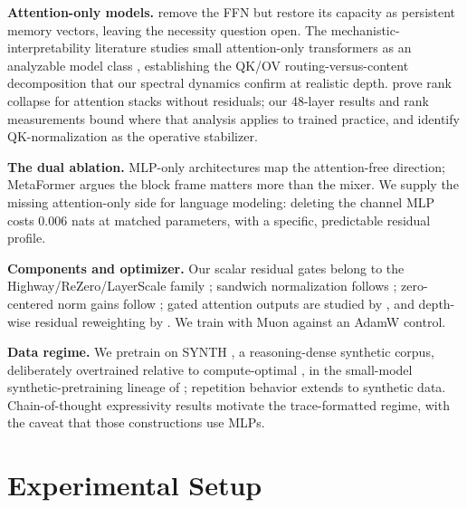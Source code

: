 \documentclass[letterpaper]{article} %
\begin{document}
\textbf{Attention-only models.} \citet{sukhbaatar2019augmenting} remove
the FFN but restore its capacity as persistent memory vectors, leaving the
necessity question open. The mechanistic-interpretability literature
studies small attention-only transformers as an analyzable model class
\citep{elhage2021mathematical,olsson2022context}, establishing the QK/OV
routing-versus-content decomposition that our spectral dynamics confirm at
realistic depth. \citet{dong2021attention} prove rank collapse for
attention stacks without residuals; our 48-layer results and rank
measurements bound where that analysis applies to trained practice, and
identify QK-normalization \citep{henry2020query,dehghani2023scaling} as
the operative stabilizer.

\textbf{The dual ablation.} MLP-only architectures
\citep{tolstikhin2021mlp,liu2021pay} map the attention-free direction;
MetaFormer \citep{yu2022metaformer} argues the block frame matters more
than the mixer. We supply the missing attention-only side for language
modeling: deleting the channel MLP costs 0.006 nats at matched parameters,
with a specific, predictable residual profile.

\textbf{Components and optimizer.} Our scalar residual gates belong to the
Highway/ReZero/LayerScale family
\citep{srivastava2015highway,bachlechner2020rezero}; sandwich
normalization follows \citet{shleifer2021normformer}; zero-centered norm
gains follow \citet{olmo2024olmo2}; gated attention outputs are studied by
\citet{qiu2025gated}, and depth-wise residual reweighting by
\citet{kimi2026attnres}. We train with Muon
\citep{jordan2024muon,liu2025muon} against an AdamW control.

\textbf{Data regime.} We pretrain on SYNTH \citep{pleias2025synth}, a
reasoning-dense synthetic corpus, deliberately overtrained relative to
compute-optimal \citep{hoffmann2022chinchilla}, in the small-model
synthetic-pretraining lineage of
\citet{eldan2023tinystories,gunasekar2023textbooks}; repetition behavior
extends \citet{muennighoff2023scaling} to synthetic data. Chain-of-thought
expressivity results \citep{merrill2024expressive,feng2023towards}
motivate the trace-formatted regime, with the caveat that those
constructions use MLPs.

\section{Experimental Setup}
\end{document}
